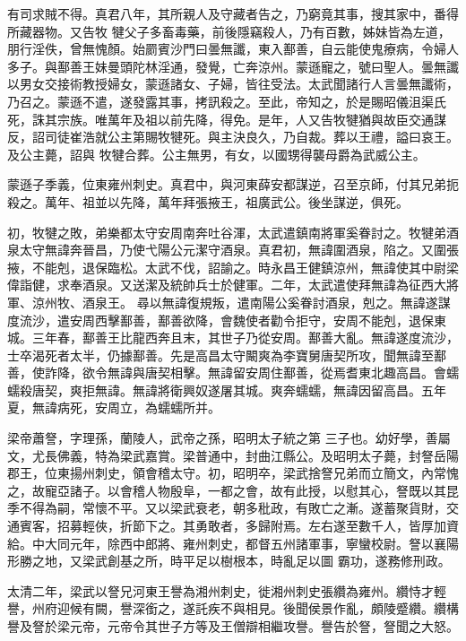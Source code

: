 \begin{pinyinscope}
 有司求賊不得。真君八年，其所親人及守藏者告之，乃窮竟其事，搜其家中，番得所藏器物。又告牧
 犍父子多畜毒藥，前後隱竊殺人，乃有百數，姊妹皆為左道，朋行淫佚，曾無愧顏。始罽賓沙門曰曇無讖，東入鄯善，自云能使鬼療病，令婦人多子。與鄯善王妹曼頭陀林淫通，發覺，亡奔涼州。蒙遜寵之，號曰聖人。曇無讖以男女交接術教授婦女，蒙遜諸女、子婦，皆往受法。太武聞諸行人言曇無讖術，乃召之。蒙遜不遣，遂發露其事，拷訊殺之。至此，帝知之，於是賜昭儀沮渠氏死，誅其宗族。唯萬年及祖以前先降，得免。是年，人又告牧犍猶與故臣交通謀反，詔司徒崔浩就公主第賜牧犍死。與主決良久，乃自裁。葬以王禮，謚曰哀王。及公主薨，詔與
 牧犍合葬。公主無男，有女，以國甥得襲母爵為武威公主。



 蒙遜子季義，位東雍州刺史。真君中，與河東薛安都謀逆，召至京師，付其兄弟扼殺之。萬年、祖並以先降，萬年拜張掖王，祖廣武公。後坐謀逆，俱死。



 初，牧犍之敗，弟樂都太守安周南奔吐谷渾，太武遣鎮南將軍奚眷討之。牧犍弟酒泉太守無諱奔晉昌，乃使弋陽公元潔守酒泉。真君初，無諱圍酒泉，陷之。又圍張掖，不能剋，退保臨松。太武不伐，詔諭之。時永昌王健鎮涼州，無諱使其中尉梁偉詣健，求奉酒泉。又送潔及統帥兵士於健軍。二年，太武遣使拜無諱為征西大將軍、涼州牧、酒泉王。
 尋以無諱復規叛，遣南陽公奚眷討酒泉，剋之。無諱遂謀度流沙，遣安周西擊鄯善，鄯善欲降，會魏使者勸令拒守，安周不能剋，退保東城。三年春，鄯善王比龍西奔且末，其世子乃從安周。鄯善大亂。無諱遂度流沙，士卒渴死者太半，仍據鄯善。先是高昌太守闞爽為李寶舅唐契所攻，聞無諱至鄯善，使詐降，欲令無諱與唐契相擊。無諱留安周住鄯善，從焉耆東北趣高昌。會蠕蠕殺唐契，爽拒無諱。無諱將衛興奴遂屠其城。爽奔蠕蠕，無諱因留高昌。五年夏，無諱病死，安周立，為蠕蠕所并。



 梁帝蕭詧，字理孫，蘭陵人，武帝之孫，昭明太子統之第
 三子也。幼好學，善屬文，尤長佛義，特為梁武嘉賞。梁普通中，封曲江縣公。及昭明太子薨，封詧岳陽郡王，位東揚州刺史，領會稽太守。初，昭明卒，梁武捨詧兄弟而立簡文，內常愧之，故寵亞諸子。以會稽人物殷阜，一都之會，故有此授，以慰其心，詧既以其昆季不得為嗣，常懷不平。又以梁武衰老，朝多秕政，有敗亡之漸。遂蓄聚貨財，交通賓客，招募輕俠，折節下之。其勇敢者，多歸附焉。左右遂至數千人，皆厚加資給。中大同元年，除西中郎將、雍州刺史，都督五州諸軍事，寧蠻校尉。詧以襄陽形勝之地，又梁武創基之所，時平足以樹根本，時亂足以圖
 霸功，遂務修刑政。



 太清二年，梁武以詧兄河東王譽為湘州刺史，徙湘州刺史張纘為雍州。纘恃才輕譽，州府迎候有闕，譽深銜之，遂託疾不與相見。後聞侯景作亂，頗陵蹙纘。纘構譽及詧於梁元帝，元帝令其世子方等及王僧辯相繼攻譽。譽告於詧，詧聞之大怒。




\end{pinyinscope}

